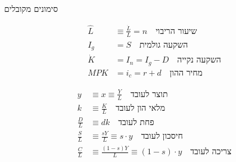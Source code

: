 \documentclass[usenames,dvipsnames, 10pt]{beamer}
\begin{document}
\begin{RTL}
\begin{frame}[allowframebreaks]
    \framebreak



    \framebreak
    
    \begin{block}{סימונים מקובלים}
        \begin{minipage}[t]{0.5\textwidth}
            \begin{align*}
            \hat{L} &\equiv \frac{\dot{L}}{L} = n \quad \text{שיעור הריבוי} \\
            I_g &= S \quad \text{השקעה גולמית} \\
            \dot{K} &= I_n = I_g - D \quad \text{השקעה נקייה}\\
            MPK &= i_c = r + d \quad \text{מחיר ההון}
            \end{align*}
        \end{minipage}%
        \begin{minipage}[t]{0.5\textwidth}
            \begin{align*}
            y &\equiv x \equiv  \frac{Y}{L} \quad \text{תוצר לעובד} \\
            k &\equiv \frac{K}{L} \quad \text{מלאי הון לעובד} \\
             \frac{D}{L} &\equiv dk \quad  \text{פחת לעובד} \\
            \frac{S}{L} &\equiv \frac{sY}{L} \equiv s \cdot y \quad \text{חיסכון לעובד} \\
            \frac{C}{L} &\equiv \frac{(1-s)Y}{L} \equiv (1 - s) \cdot y \quad \text{צריכה לעובד}
            \end{align*}
        \end{minipage}
    \end{block}


\end{frame}
\end{RTL}
\end{document}
